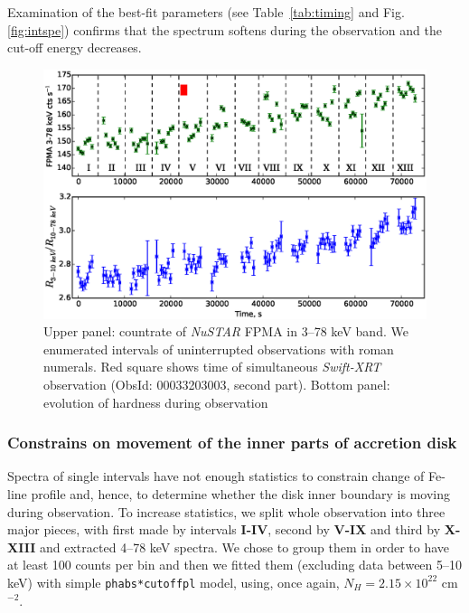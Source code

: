 \documentclass[a4paper,fleqn,usenatbib]{mnras}
\def\swiftx{{\em Swift-XRT\,}}
\def\nustar{{\em NuSTAR\,}}
\begin{document}
Examination of the best-fit parameters (see Table~\ref{tab:timing} and Fig.\ref{fig:intspe}) confirms that the spectrum softens during the observation and the cut-off energy decreases. 

\begin{figure}
\centerline{\includegraphics[scale=0.7]{nuAlc_color_v04.eps}}
\caption{Upper panel: countrate of \nustar\,FPMA in 3--78 keV band. We enumerated intervals of uninterrupted observations with roman numerals. Red square shows time of simultaneous \swiftx observation (ObsId: 00033203003, second part). Bottom panel: evolution of hardness during observation} 
\label{fig:nust_lc}
\end{figure} 


\subsubsection{Constrains on movement of the inner parts of accretion disk}
Spectra of single intervals have not enough statistics to constrain change of Fe-line profile and, hence, to determine whether the disk inner boundary  is moving during observation. 
To increase statistics, we split whole observation into three major pieces, with first made by intervals {\bf I-IV}, second by {\bf V-IX} and third by {\bf X-XIII} and extracted 4--78 keV spectra. 
We chose to group them in order to have at least 100 counts per bin and then we fitted them (excluding data between 5--10 keV) with simple \texttt{phabs*cutoffpl} model, using, once again, $N_{H} = 2.15\times10^{22}$ cm$^{-2}$.  
\end{document}
